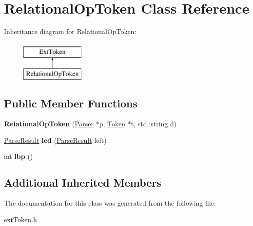 \hypertarget{classRelationalOpToken}{\section{Relational\-Op\-Token Class Reference}
\label{classRelationalOpToken}
}
Inheritance diagram for Relational\-Op\-Token\-:\begin{figure}[H]
\begin{center}
\leavevmode
\includegraphics[height=2.000000cm]{classRelationalOpToken}
\end{center}
\end{figure}
\subsection*{Public Member Functions}
\begin{DoxyCompactItemize}
\item 
\hypertarget{classRelationalOpToken_a1ede45cf178138ff12beba209681be51}{{\bfseries Relational\-Op\-Token} (\hyperlink{classParser}{Parser} $\ast$p, \hyperlink{classToken}{Token} $\ast$t, std\-::string d)}\label{classRelationalOpToken_a1ede45cf178138ff12beba209681be51}

\item 
\hypertarget{classRelationalOpToken_a426c64391e7b3272d8e6277964730e05}{\hyperlink{classParseResult}{Parse\-Result} {\bfseries led} (\hyperlink{classParseResult}{Parse\-Result} left)}\label{classRelationalOpToken_a426c64391e7b3272d8e6277964730e05}

\item 
\hypertarget{classRelationalOpToken_ada096491d9553aea21089230489d6aef}{int {\bfseries lbp} ()}\label{classRelationalOpToken_ada096491d9553aea21089230489d6aef}

\end{DoxyCompactItemize}
\subsection*{Additional Inherited Members}


The documentation for this class was generated from the following file\-:\begin{DoxyCompactItemize}
\item 
ext\-Token.\-h\end{DoxyCompactItemize}
